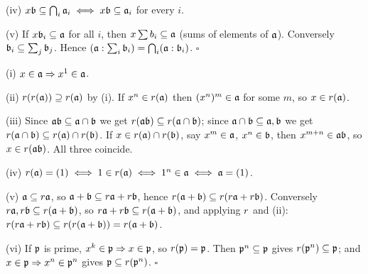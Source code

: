 \documentclass[11pt]{article}
\begin{document}
(iv) $x\mathfrak b\subseteq\bigcap_i\mathfrak a_i\iff x\mathfrak b\subseteq\mathfrak a_i$ for every $i$.

(v) If $x\mathfrak b_i\subseteq\mathfrak a$ for all $i$, then $x\sum b_i\subseteq\mathfrak a$ (sums of elements of $\mathfrak a$). Conversely $\mathfrak b_i\subseteq\sum_j\mathfrak b_j$. Hence $(\mathfrak a:\sum_i\mathfrak b_i)=\bigcap_i(\mathfrak a:\mathfrak b_i)$. \hfill$\square$

\pf
(i) $x\in\mathfrak a\Rightarrow x^1\in\mathfrak a$.

(ii) $r(r(\mathfrak a))\supseteq r(\mathfrak a)$ by (i). If $x^n\in r(\mathfrak a)$ then $(x^n)^m\in\mathfrak a$ for some $m$, so $x\in r(\mathfrak a)$.

(iii) Since $\mathfrak a\mathfrak b\subseteq\mathfrak a\cap\mathfrak b$ we get $r(\mathfrak a\mathfrak b)\subseteq r(\mathfrak a\cap\mathfrak b)$; since $\mathfrak a\cap\mathfrak b\subseteq\mathfrak a,\mathfrak b$ we get $r(\mathfrak a\cap\mathfrak b)\subseteq r(\mathfrak a)\cap r(\mathfrak b)$. If $x\in r(\mathfrak a)\cap r(\mathfrak b)$, say $x^m\in\mathfrak a$, $x^n\in\mathfrak b$, then $x^{m+n}\in\mathfrak a\mathfrak b$, so $x\in r(\mathfrak a\mathfrak b)$. All three coincide.

(iv) $r(\mathfrak a)=(1)\iff 1\in r(\mathfrak a)\iff 1^n\in\mathfrak a\iff\mathfrak a=(1)$.

(v) $\mathfrak a\subseteq r\mathfrak a$, so $\mathfrak a+\mathfrak b\subseteq r\mathfrak a+r\mathfrak b$, hence $r(\mathfrak a+\mathfrak b)\subseteq r(r\mathfrak a+r\mathfrak b)$. Conversely $r\mathfrak a,r\mathfrak b\subseteq r(\mathfrak a+\mathfrak b)$, so $r\mathfrak a+r\mathfrak b\subseteq r(\mathfrak a+\mathfrak b)$, and applying $r$ and (ii): $r(r\mathfrak a+r\mathfrak b)\subseteq r(r(\mathfrak a+\mathfrak b))=r(\mathfrak a+\mathfrak b)$.

(vi) If $\mathfrak p$ is prime, $x^k\in\mathfrak p\Rightarrow x\in\mathfrak p$, so $r(\mathfrak p)=\mathfrak p$. Then $\mathfrak p^n\subseteq\mathfrak p$ gives $r(\mathfrak p^n)\subseteq\mathfrak p$; and $x\in\mathfrak p\Rightarrow x^n\in\mathfrak p^n$ gives $\mathfrak p\subseteq r(\mathfrak p^n)$. \hfill$\square$
\end{document}
